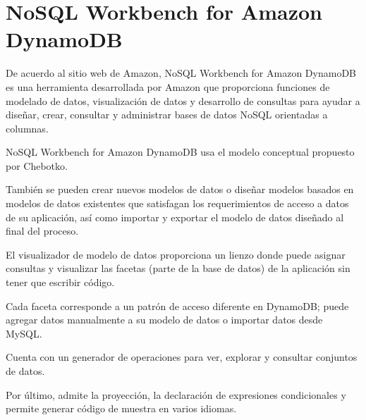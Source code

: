 \section{NoSQL Workbench for Amazon DynamoDB}

De acuerdo al sitio web de Amazon\cite{amazon_nosql_2020}, NoSQL Workbench for Amazon DynamoDB es una herramienta desarrollada por Amazon que proporciona funciones de modelado de datos, visualización de datos y desarrollo de consultas para ayudar a diseñar, crear, consultar y administrar bases de datos NoSQL orientadas a columnas.


NoSQL Workbench for Amazon DynamoDB usa el modelo conceptual propuesto por Chebotko\cite{chebotko_big_2015}.


También se pueden crear nuevos modelos de datos o diseñar modelos basados ​​en modelos de datos existentes que satisfagan los requerimientos de acceso a datos de su aplicación, así como importar y exportar el modelo de datos diseñado al final del proceso. 


El visualizador de modelo de datos proporciona un lienzo donde puede asignar consultas y visualizar las facetas (parte de la base de datos) de la aplicación sin tener que escribir código.


Cada faceta corresponde a un patrón de acceso diferente en DynamoDB; puede agregar datos manualmente a su modelo de datos o importar datos desde MySQL. 


Cuenta con un generador de operaciones para ver, explorar y consultar conjuntos de datos.


Por último, admite la proyección, la declaración de expresiones condicionales y permite generar código de muestra en varios idiomas.

